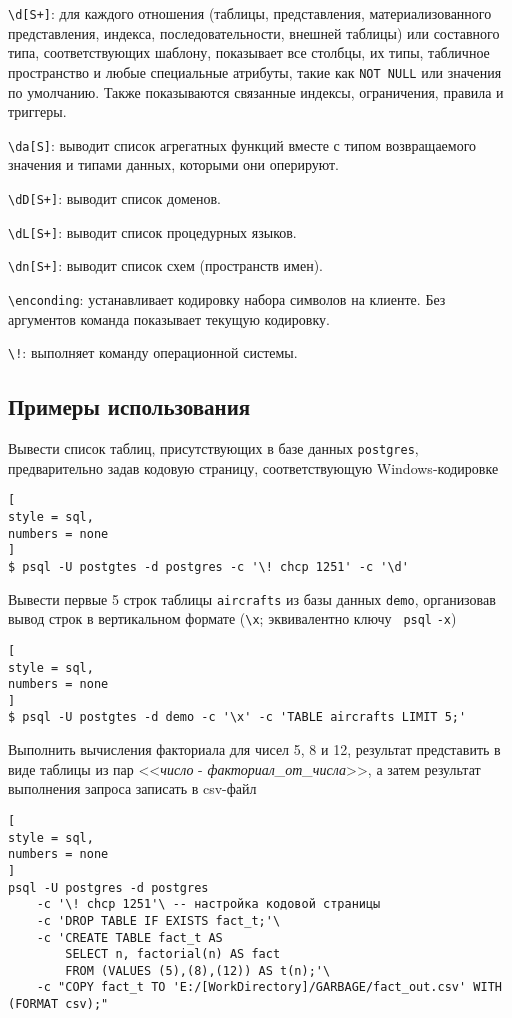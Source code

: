 \documentclass[%
	11pt,
	a4paper,
	utf8,
		]{article}
\begin{document}
\noindent \verb|\d[S+]|: для каждого отношения (таблицы, представления, материализованного представления, индекса, последовательности, внешней таблицы) или составного типа, соответствующих шаблону, показывает все столбцы, их типы, табличное пространство и любые специальные атрибуты, такие как \texttt{NOT NULL} или значения по умолчанию. Также показываются связанные индексы, ограничения, правила и триггеры.

\noindent\verb|\da[S]|: выводит список агрегатных функций вместе с типом возвращаемого значения и типами данных, которыми они оперируют.

\noindent\verb|\dD[S+]|: выводит список доменов.

\noindent\verb|\dL[S+]|: выводит список процедурных языков.

\noindent\verb|\dn[S+]|: выводит список схем (пространств имен).

\noindent\verb|\enconding|: устанавливает кодировку набора символов на клиенте. Без аргументов команда показывает текущую кодировку.

\noindent\verb|\!|: выполняет команду операционной системы.



\subsection{Примеры использования}

Вывести список таблиц, присутствующих в базе данных \texttt{postgres}, предварительно задав кодовую страницу, соответствующую Windows-кодировке
\begin{lstlisting}[
style = sql,
numbers = none
]
$ psql -U postgtes -d postgres -c '\! chcp 1251' -c '\d'
\end{lstlisting}

Вывести первые 5 строк таблицы \texttt{aircrafts} из базы данных \texttt{demo}, организовав вывод строк в вертикальном формате (\verb|\x|; эквивалентно ключу \texttt{ psql} \verb|-x|)
\begin{lstlisting}[
style = sql,
numbers = none
]
$ psql -U postgtes -d demo -c '\x' -c 'TABLE aircrafts LIMIT 5;'
\end{lstlisting}

Выполнить вычисления факториала для чисел 5, 8 и 12, результат представить в виде таблицы из пар <<\emph{число} - \emph{факториал\_от\_числа}>>, а затем результат выполнения запроса записать в csv-файл
\begin{lstlisting}[
style = sql,
numbers = none
]
psql -U postgres -d postgres
    -c '\! chcp 1251'\ -- настройка кодовой страницы
    -c 'DROP TABLE IF EXISTS fact_t;'\
    -c 'CREATE TABLE fact_t AS
        SELECT n, factorial(n) AS fact
        FROM (VALUES (5),(8),(12)) AS t(n);'\
    -c "COPY fact_t TO 'E:/[WorkDirectory]/GARBAGE/fact_out.csv' WITH (FORMAT csv);"
\end{lstlisting}
\end{document}

